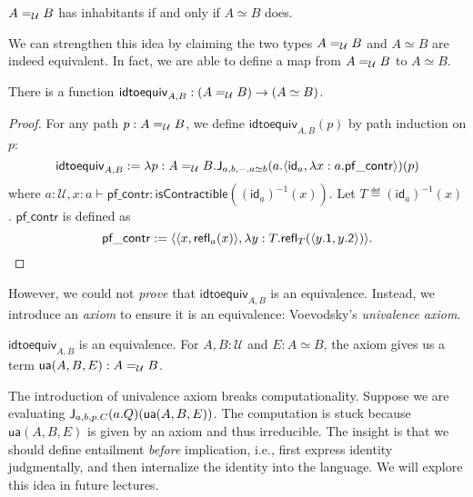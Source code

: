 \documentclass{article}
\newcommand{\calU}{\mathcal{U}}
\begin{document}
\begin{proposition}
	$\Ideq{\calU}{A}{B}$ has inhabitants if and only if $A \simeq B$ does.
\end{proposition}

We can strengthen this idea by claiming the two types $\Ideq{\calU}{A}{B}$ 
and $A \simeq 
B$ are indeed equivalent.
In fact, we are able to define a map from $\Ideq{\calU}{A}{B}$ to $A 
\simeq B$.

\begin{lemma}
	There is a function $\mathsf{idtoequiv}_{A,B} : (\Ideq{\calU}{A}{B}) \to (A 
	\simeq 
	B)$.
\end{lemma}
\begin{proof}
	For any path $p : \Ideq{\calU}{A}{B}$, we define 
	$\mathsf{idtoequiv}_{A,B}(p)$ 
	by path induction on $p$:
	\[
	\mathsf{idtoequiv}_{A,B} \eqdef \lambda p : \Ideq{\calU}{A}{B}. 
	\Idelim{a,b,-. a 
	\simeq b}{a.  \langle \mathsf{id}_a,  
	\lambda x : a. \mathsf{pf\_contr}  \rangle 
	}{p}
	\]
	where $a : \calU, x : a \vdash \mathsf{pf\_contr} : 
	\mathsf{isContractible}((\mathsf{id}_a)^{-1}(x))$.
	Let $T \eqdef (\mathsf{id}_a)^{-1}(x)$.
	$\mathsf{pf\_contr}$ is defined as
	\[
	\mathsf{pf\_contr} := \langle  \langle x, 
	\mathsf{refl}_{a}(x) \rangle , 
	\lambda y : 
	T.  \mathsf{refl}_{T}( \langle y.\mathsf{1}, y.\mathsf{2}  \rangle   ) \rangle.
	\]
\end{proof}

However, we could not \emph{prove} that $\mathsf{idtoequiv}_{A,B}$ is an 
equivalence.
Instead, we introduce an \emph{axiom} to ensure it is an equivalence: 
Voevodsky’s \emph{univalence axiom}.

\begin{axiom}[Univalence]
	$\mathsf{idtoequiv}_{A,B}$ is an equivalence.
	For $A,B : \calU$ and $E : A \simeq B$, the axiom gives us a term 
	$\mathsf{ua}(A,B,E) : \Ideq{\calU}{A}{B}$.
\end{axiom}

\begin{remark}
	The introduction of univalence axiom breaks computationality.
	Suppose we are evaluating $\mathsf{J}_{a,b,p.C}(a.Q)(\mathsf{ua}(A,B,E))$.
	The computation is stuck because $\mathsf{ua}(A,B,E)$ is given by an axiom 
	and thus irreducible.
	The insight is that we should define entailment \emph{before} implication, 
	i.e., first express identity judgmentally, and then internalize the identity into 
	the language.
	We will explore this idea in future lectures.
\end{remark}
\end{document}
